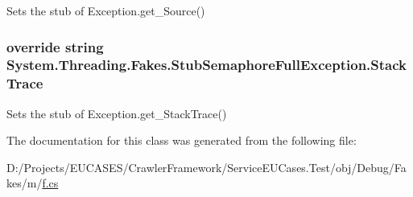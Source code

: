 Sets the stub of Exception.\-get\-\_\-\-Source()

\hypertarget{class_system_1_1_threading_1_1_fakes_1_1_stub_semaphore_full_exception_ae41b91a94c8f435e1fa1c8e986c1e0d6}{
\subsubsection[{Stack\-Trace}]{\setlength{\rightskip}{0pt plus 5cm}override string System.\-Threading.\-Fakes.\-Stub\-Semaphore\-Full\-Exception.\-Stack\-Trace\hspace{0.3cm}{\ttfamily [get]}}}\label{class_system_1_1_threading_1_1_fakes_1_1_stub_semaphore_full_exception_ae41b91a94c8f435e1fa1c8e986c1e0d6}


Sets the stub of Exception.\-get\-\_\-\-Stack\-Trace()



The documentation for this class was generated from the following file\-:\begin{DoxyCompactItemize}
\item 
D\-:/\-Projects/\-E\-U\-C\-A\-S\-E\-S/\-Crawler\-Framework/\-Service\-E\-U\-Cases.\-Test/obj/\-Debug/\-Fakes/m/\hyperlink{m_2f_8cs}{f.\-cs}\end{DoxyCompactItemize}
